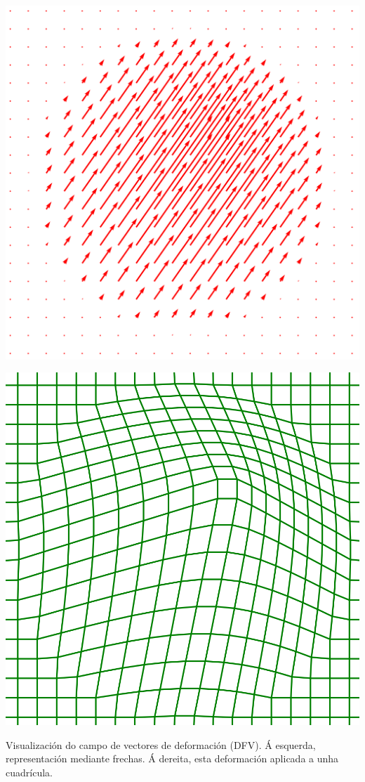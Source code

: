 \documentclass[xcolor=dvipsnames]{beamer}
\begin{document}
\begin{frame}
    \begin{minipage}{0.35\textwidth}
        \centering
        \includegraphics[width=\linewidth]{../imaxes/dfv_arrows.png}
    \end{minipage}
    \hfill
    \begin{minipage}{0.35\textwidth}
        \centering
        \includegraphics[width=\linewidth]{../imaxes/dfv_grid.png}
    \end{minipage}

    \begin{center}
        \small{Visualización do campo de vectores de deformación (DFV). Á esquerda, representación mediante frechas. Á dereita, esta deformación aplicada a unha cuadrícula.}
    \end{center}
\end{frame}
\end{document}
